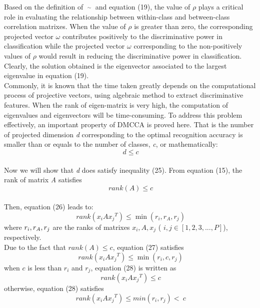 \documentclass[journal]{IEEEtran}
\begin{document}
Based on the definition of $\mathop {{C_{{x_k}{x_m}}}}\limits^ \sim  $ and equation (19), the value of ${\rho}$ plays a critical role in evaluating the relationship between within-class and between-class correlation matrixes. When the value of ${\rho}$ is greater than zero, the corresponding projected vector ${\omega}$ contributes positively to the discriminative power in classification while the projected vector ${\omega}$ corresponding to the non-positively values of ${\rho}$ would result in reducing the discriminative power in classification. Clearly, the solution obtained is the eigenvector associated to the largest eigenvalue in equation (19).\\\indent
Commonly, it is known that the time taken greatly depends on the computational process of projective vectors, using algebraic method to extract discriminative features. When the rank of eigen-matrix is very high, the computation of eigenvalues and eigenvectors will be time-consuming. To address this problem effectively, an important property of DMCCA is proved here. That is the number of projected dimension \emph{d} corresponding to the optimal recognition accuracy is smaller than or equals to the number of classes, \emph{c}, or mathematically:
\begin{equation} \ d \le c \end{equation}\\\indent
Now we will show that \emph{d} does satisfy inequality (25).
From equation (15), the rank of matrix \emph{A} satisfies
\begin{equation} \ rank(A) \le c \end{equation}\\\indent
Then, equation (26) leads to:
\begin{equation} \ rank({x_i}A{x_j}^T) \le \min ({r_i},{r_A},{r_j}) \end{equation}
where ${r_i},{\rm{  }}{r_A},{\rm{  }}{r_j}$ are the ranks of matrixes ${x_i},A,{x_j}$ (
$ i,j \in [1,2,3,...,P] $), respectively.\\\indent
Due to the fact that $rank(A) \le c$, equation (27) satisfies
\begin{equation} \ rank({x_i}A{x_j}^T) \le \min ({r_i},{c},{r_j}) \end{equation}
when $c$ is less than ${r_i}$ and ${r_j}$, equation (28) is written as
\begin{equation} \ rank({x_i}A{x_j}^T) \le {c} \end{equation}
otherwise, equation (28) satisfies
\begin{equation} \ rank({x_i}A{x_j}^T) \le min({r_i,r_j}) <\ {c} \end{equation}\\\indent
\end{document}
